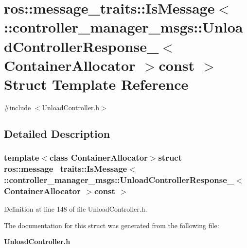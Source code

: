 \section{ros\-:\-:message\-\_\-traits\-:\-:\-Is\-Message$<$ \-:\-:controller\-\_\-manager\-\_\-msgs\-:\-:\-Unload\-Controller\-Response\-\_\-$<$ \-Container\-Allocator $>$const $>$ \-Struct \-Template \-Reference}
\label{structros_1_1message__traits_1_1IsMessage_3_01_1_1controller__manager__msgs_1_1UnloadControllerRd104666c741f4ee2153f666061dba2b1}


{\ttfamily \#include $<$\-Unload\-Controller.\-h$>$}



\subsection{\-Detailed \-Description}
\subsubsection*{template$<$class Container\-Allocator$>$struct ros\-::message\-\_\-traits\-::\-Is\-Message$<$ \-::controller\-\_\-manager\-\_\-msgs\-::\-Unload\-Controller\-Response\-\_\-$<$ Container\-Allocator $>$const  $>$}



\-Definition at line 148 of file \-Unload\-Controller.\-h.



\-The documentation for this struct was generated from the following file\-:\begin{DoxyCompactItemize}
\item 
{\bf \-Unload\-Controller.\-h}\end{DoxyCompactItemize}

